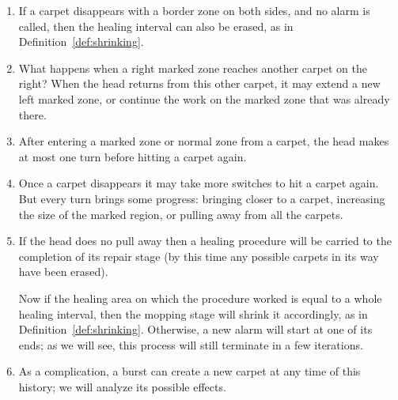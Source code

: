 \documentclass[12pt]{memoir}
\begin{document}
\begin{enumerate}
\item If a carpet disappears with a border zone on both sides, and no alarm
is called, then the healing interval can also be erased, as in Definition~\ref{def:shrinking}.

\item What happens when a right marked zone reaches another carpet on the right?
When the head returns from this other carpet, it may
extend a new left marked zone, or continue the work on the marked zone
that was already there.

\item After entering a marked zone or normal zone from a carpet, the head makes at most one turn
before hitting a carpet again.

\item Once a carpet disappears it may take more switches to hit a carpet again.
But every turn brings some progress: bringing closer to a carpet,
increasing the size of the marked region, or pulling away from all the carpets.

\item\label{i:outline.mop} If the head does no pull away then a 
healing procedure will be carried to the completion of its repair stage (by this time
any possible carpets in its way have been erased).

Now if the healing area on which the procedure worked is equal to a whole healing interval,
then the mopping stage will shrink it accordingly, as in Definition~\ref{def:shrinking}.
Otherwise, a new alarm will start at one of its ends; as we will see, this process
will still terminate in a few iterations.

\item As a complication, a burst can create a new carpet at any time of this history;
we will analyze its possible effects.

\end{enumerate}
\end{document}
